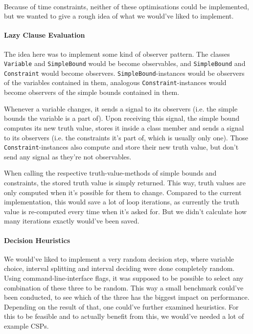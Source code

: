 \paragraph{}
Because of time constraints, neither of these optimisations could be implemented, but we wanted to give a rough idea of what we would've liked to implement.

\paragraph{Lazy Clause Evaluation}
The idea here was to implement some kind of observer pattern.
The classes \texttt{Variable} and \texttt{SimpleBound} would be become observables, and \texttt{SimpleBound} and \texttt{Constraint} would become observers.
\texttt{SimpleBound}-instances would be observers of the variables contained in them, analogous \texttt{Constraint}-instances would become observers of the simple bounds contained in them.

Whenever a variable changes, it sends a signal to its observers (i.e. the simple bounds the variable is a part of).
Upon receiving this signal, the simple bound computes its new truth value, stores it inside a class member and sends a signal to its observers (i.e. the constraints it's part of, which is usually only one).
Those \texttt{Constraint}-instances also compute and store their new truth value, but don't send any signal as they're not observables.

When calling the respective truth-value-methods of simple bounds and constraints, the stored truth value is simply returned.
This way, truth values are only computed when it's possible for them to change.
Compared to the current implementation, this would save a lot of loop iterations, as currently the truth value is re-computed every time when it's asked for.
But we didn't calculate how many iterations exactly would've been saved.


\paragraph{Decision Heuristics}
We would've liked to implement a very random decision step, where variable choice, interval splitting and interval deciding were done completely random.
Using command-line-interface flags, it was supposed to be possible to select any combination of these three to be random.
This way a small benchmark could've been conducted, to see which of the three has the biggest impact on performance.
Depending on the result of that, one could've further examined heuristics.
For this to be feasible and to actually benefit from this, we would've needed a lot of example CSPs.
